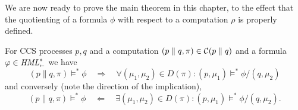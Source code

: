 We are now ready to prove the main theorem in this chapter, to the effect that
the quotienting of a formula $\phi$ with respect to a computation $\rho$ is
properly defined.

\begin{theorem}\label{thm:decomposition}
    For CCS processes $p,q$ and a computation $(p \parallel q, \pi)\in \mathcal{C}(p\parallel q)$
    and a formula $\varphi \in \textit{HML}_\shortleftarrow^*$ we have
    \begin{equation}\label{eq:decomp_ltr}
        (p\parallel q, \pi) \vDash^* \phi  \quad\Rightarrow\quad
        \forall (\mu_1,\mu_2) \in D(\pi) : (p, \mu_1) \vDash^* \phi/(q, \mu_2)
    \end{equation}
    and conversely (note the direction of the implication),
    \begin{equation}\label{eq:decomp_rtl}
        (p\parallel q, \pi) \vDash^* \phi
        \quad\Leftarrow\quad
        \exists (\mu_1,\mu_2) \in D(\pi) : (p, \mu_1) \vDash^* \phi/(q, \mu_2).
    \end{equation}
\end{theorem}
